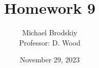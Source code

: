 


\title{Homework 9}
\date{November 29, 2023}
\author{Michael Brodskiy\\ \small Professor: D. Wood}



\maketitle

